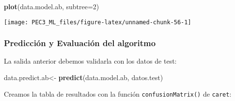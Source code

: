 \documentclass[
]{article}
\newenvironment{Shaded}{\begin{snugshade}}{\end{snugshade}}
\newcommand{\DataTypeTok}[1]{\textcolor[rgb]{0.13,0.29,0.53}{#1}}
\newcommand{\DecValTok}[1]{\textcolor[rgb]{0.00,0.00,0.81}{#1}}
\newcommand{\KeywordTok}[1]{\textcolor[rgb]{0.13,0.29,0.53}{\textbf{#1}}}
\newcommand{\NormalTok}[1]{#1}
\newcommand{\OperatorTok}[1]{\textcolor[rgb]{0.81,0.36,0.00}{\textbf{#1}}}
\newcommand{\StringTok}[1]{\textcolor[rgb]{0.31,0.60,0.02}{#1}}
\begin{document}
\begin{Shaded}
\begin{Highlighting}[]
\KeywordTok{plot}\NormalTok{(data.model.ab, }\DataTypeTok{subtree=}\DecValTok{2}\NormalTok{) }
\end{Highlighting}
\end{Shaded}

\begin{center}\texttt{[image: PEC3\_ML\_files/figure-latex/unnamed-chunk-56-1]} \end{center}

\hypertarget{predicciuxf3n-y-evaluaciuxf3n-del-algoritmo-3}{%
\subsubsection{Predicción y Evaluación del
algoritmo}\label{predicciuxf3n-y-evaluaciuxf3n-del-algoritmo-3}}

La salida anterior debemos validarla con los datos de test:

\begin{Shaded}
\begin{Highlighting}[]
\NormalTok{data.predict.ab<-}\StringTok{ }\KeywordTok{predict}\NormalTok{(data.model.ab, datos.test)}
\end{Highlighting}
\end{Shaded}

Creamos la tabla de resultados con la función \texttt{confusionMatrix()}
de \texttt{caret}:

\begin{Shaded}
\end{Shaded}
\end{document}
